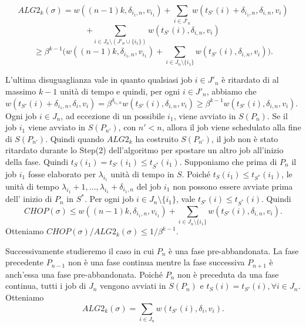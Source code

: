 \documentclass[12pt]{article}
\begin{document}
$$ALG2_{k}(\sigma ) = w((n - 1)k, \delta_{i_{1} ,n}, v_{i_{1}}) + \sum_{i \in J'_{n}} w(t_{S'}(i)+ \delta_{i_{1} ,n}, \delta_{i ,n}, v_{i})$$
$$+ \sum_{i \in J_{n} \setminus (J'_{n} \cup\{i_{1}\})} w(t_{S'}(i), \delta_{i,n},v_{i})$$ 
$$\geq \beta^{k-1}\Bigg( w((n - 1)k, \delta_{i_{1},n}, v_{i_{1}} ) + \sum_{i \in J_{n} \setminus\{i_{1}\}} w(t_{S'}(i),\delta_{i,n}, v_{i})\Bigg).$$

L'ultima disuguaglianza vale in quanto qualsiasi job $i \in J'_{n}$ è ritardato di al massimo $k - 1$ unità di tempo e quindi, per ogni $i \in J'_{n}$, abbiamo che $w(t_{S'}(i) + \delta_{i_{1}, n}, \delta_{i}, v_{i}) = \beta^{\delta_{i_{1},n}} w(t_{S'}(i), \delta_{i, n}, v_{i}) \geq \beta^{k - 1} w (t_{S'}(i), \delta_{i,n}, v_{i})$. Ogni job $i \in J_{n}$, ad eccezione di un possibile $i_{1}$, viene avviato in $S(P_{n})$. Se il job $i_{1}$ viene avviato in $S(P_{n'})$, con $n' < n$, allora il job viene schedulato alla fine di $S(P_{n'})$. Quindi quando $ALG2_{k}$ ha costruito $S(P_{n'})$, il job non è stato ritardato durante lo Step(2) dell'algoritmo per spostare un altro job all'inizio della fase. Quindi $t_{S}(i_{1}) = t_{S'}(i_{1}) \leq t_{S^{*}}(i_{1})$. Supponiamo che prima di $P_{n}$ il job $i_{1}$ fosse elaborato per $\lambda_{i_{1}}$ unità di tempo in $S$. Poiché $t_{S}(i_{1}) \leq t_{S^{*}} (i_{1})$, le unità di tempo $\lambda_{i_{1}} + 1, ... , \lambda_{i_{1}} + \delta_{i_{1},n}$ del job $i_{1}$ non possono essere avviate prima dell' inizio di $P_{n}$ in $S^{*}$. Per ogni job $i \in J_{n} \setminus \{i_{1}\}$, vale $t_{S'}(i) \leq t_{S^{*}}(i)$. Quindi
$$CHOP(\sigma) \leq w((n - 1)k, \delta_{i_{1},n}, v_{i_{1}}) + \sum_{i \in J_{n} \setminus \{i_{1}\}} w(t_{S'}(i), \delta_{i,n}, v_{i}).$$
Otteniamo $CHOP(\sigma) / ALG2_{k}(\sigma) \leq 1 / \beta^{k - 1}$.

Successivamente studieremo il caso in cui $P_{n}$ è una fase pre-abbandonata. La fase precedente $P_{n - 1}$ non è una fase continua mentre la fase successiva $P_{n+1}$ è anch'essa una fase pre-abbandonata. Poiché $P_{n}$ non è preceduta da una fase continua, tutti i job di $J_{n}$ vengono avviati in $S(P_{n})$ e $t_{S}(i) = t_{S'}(i), \forall i \in J_{n}$. Otteniamo
$$ALG2_{k} (\sigma) = \sum_{i \in J_{n}} w(t_{S'}(i), \delta_{i}, v_{i}).$$
\end{document}
